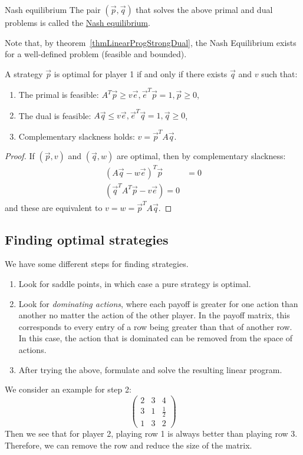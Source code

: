 \documentclass[../Main.tex]{subfiles}
\begin{document}
\begin{definition}{Nash equilibrium}
    The pair $(\vec{p}, \vec{q})$ that solves the above primal and dual problems is called the \underline{Nash equilibrium}.
\end{definition}

Note that, by theorem~\ref{thmLinearProgStrongDual}, the Nash Equilibrium exists for a well-defined problem (feasible and bounded).

\begin{theorem}
    A strategy $\vec{p}$ is optimal for player 1 if and only if there exists $\vec{q}$ and $v$ such that:
    \begin{enumerate}
        \item The primal is feasible: $A^T\vec{p} \geq v\vec{e}, \vec{e}^T \vec{p} = 1, \vec{p} \geq 0$,
        \item The dual is feasible: $A\vec{q} \leq v\vec{e}, \vec{e}^T\vec{q} = 1, \vec{q} \geq 0$,
        \item Complementary slackness holds: $v = \vec{p}^T A \vec{q}$.
    \end{enumerate}
\end{theorem}
\begin{proof}
    If $(\vec{p}, v)$ and $(\vec{q}, w)$ are optimal, then by complementary slackness:
    \begin{align*}
        (A\vec{q} - w\vec{e})^T \vec{p} &= 0 \\
        (\vec{q}^T A^T\vec{p} - v\vec{e}) = 0
    \end{align*}
    and these are equivalent to $v = w = \vec{p}^T A \vec{q}$.
\end{proof}
\subsection{Finding optimal strategies}
We have some different steps for finding strategies.
\begin{enumerate}
    \item Look for saddle points, in which case a pure strategy is optimal.
    \item Look for \textit{dominating actions}, where each payoff is greater for one action than another no matter the action of the other player. In the payoff matrix, this corresponds to every entry of a row being greater than that of another row. In this case, the action that is dominated can be removed from the space of actions.
    \item After trying the above, formulate and solve the resulting linear program. 
\end{enumerate}
We consider an example for step 2:
\begin{equation*}
    \begin{pmatrix}
        2 & 3 & 4 \\
        3 & 1 & \frac{1}{2} \\
        1 & 3 & 2
    \end{pmatrix}
\end{equation*}
Then we see that for player 2, playing row 1 is always better than playing row 3. Therefore, we can remove the row and reduce the size of the matrix.
\end{document}
